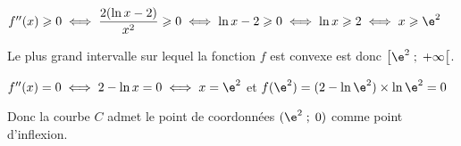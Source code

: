 \begin{enumerate}
$f''(x)\geqslant0
\iff
\dfrac{2(\ln x-2)}{x^{2}} \geqslant 0
\iff
\ln x - 2\geqslant 0
\iff
\ln x \geqslant 2
\iff
x\geqslant \e^{2}$

Le plus grand intervalle sur lequel la fonction $f$ est convexe est donc
$\left [  \e^{2}\;;\;+\infty\right [$.

$f''(x)=0 \iff 2-\ln x=0 \iff x=\e^{2}$ et
$f(\e^{2})=(2-\ln \e^{2})\times \ln \e^{2}=0$

Donc la courbe $C$ admet le point de coordonnées $(\e^{2}\;;\;0)$ comme point d'inflexion.

\end{enumerate}

\vspace{1cm}
